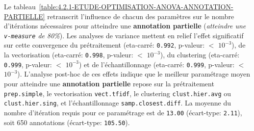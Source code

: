 				Le tableau~\ref{table:4.2.1-ETUDE-OPTIMISATION-ANOVA-ANNOTATION-PARTIELLE} retranscrit l'influence de chacun des paramètres sur le nombre d'itérations nécessaires pour atteindre une \textbf{annotation partielle} (\textit{atteindre une \texttt{v-measure} de 80\%}).
				Les analyses de variance mettent en relief l'effet significatif sur cette convergence du prétraitement (eta-carré: \texttt{0.992}, p-valeur: \(<\) \texttt{\(10^{-3}\)}), de la vectorisation (eta-carré: \texttt{0.998}, p-valeur: \(<\) \texttt{\(10^{-3}\)}), du clustering (eta-carré: \texttt{0.999}, p-valeur: \(<\) \texttt{\(10^{-3}\)}) et de l'échantillonnage (eta-carré: \texttt{0.999}, p-valeur: \(<\) \texttt{\(10^{-3}\)}).
				L'analyse post-hoc de ces effets indique que le meilleur paramétrage moyen pour atteindre une \textbf{annotation partielle} repose sur la prétraitement \texttt{prep.simple}, le vectorisation \texttt{vect.tfidf}, le clustering \texttt{clust.hier.avg} ou \texttt{clust.hier.sing}, et l'échantillonnage \texttt{samp.closest.diff}. La moyenne du nombre d'itération requis pour ce paramétrage est de \texttt{13.00} (écart-type: \texttt{2.11}), soit 650 annotations (écart-type: \texttt{105.50}).
